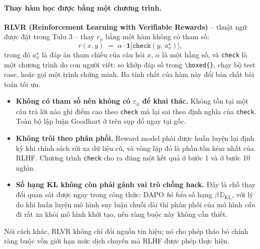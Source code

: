 \paragraph{Thay hàm học được bằng một chương trình.}
\textbf{RLVR (Reinforcement Learning with Verifiable Rewards)} -- thuật ngữ được đặt trong Tulu 3 \cite{lambert2024tulu3} -- thay $r_\phi$ bằng một hàm không có tham số:
\[
r(x,y) \;=\; \alpha \cdot \mathbf{1}\big[\texttt{check}(y,\, a^\star_x)\big],
\]
trong đó $a^\star_x$ là đáp án tham chiếu của câu hỏi $x$, $\alpha$ là một hằng số, và \texttt{check} là một chương trình do con người viết: so khớp đáp số trong \texttt{\textbackslash boxed\{\}}, chạy bộ test case, hoặc gọi một trình chứng minh. Ba tính chất của hàm này đổi bản chất bài toán tối ưu.
\begin{itemize}
	\item \textbf{Không có tham số nên không có $\varepsilon_\phi$ để khai thác.} Không tồn tại một câu trả lời nào ghi điểm cao theo \texttt{check} mà lại sai theo định nghĩa của \texttt{check}. Toàn bộ lập luận Goodhart ở trên sụp đổ ngay tại gốc.
	\item \textbf{Không trôi theo phân phối.} Reward model phải được huấn luyện lại định kỳ khi chính sách rời xa dữ liệu cũ, và vòng lặp đó là phần tốn kém nhất của RLHF. Chương trình \texttt{check} cho ra đúng một kết quả ở bước 1 và ở bước 10 nghìn.
	\item \textbf{Số hạng KL không còn phải gánh vai trò chống hack.} Đây là chỗ thay đổi quan sát được ngay trong công thức: DAPO \cite{yu2025dapo} \emph{bỏ hẳn} số hạng $\beta\,\mathbb{D}_{\mathrm{KL}}$, với lý do khi huấn luyện mô hình suy luận chuỗi dài thì phân phối của mô hình \emph{cần} đi rất xa khỏi mô hình khởi tạo, nên ràng buộc này không cần thiết.
\end{itemize}
Nói cách khác, RLVR không chỉ đổi nguồn tín hiệu; nó cho phép tháo bỏ chính ràng buộc vốn giới hạn mức dịch chuyển mà RLHF được phép thực hiện.

